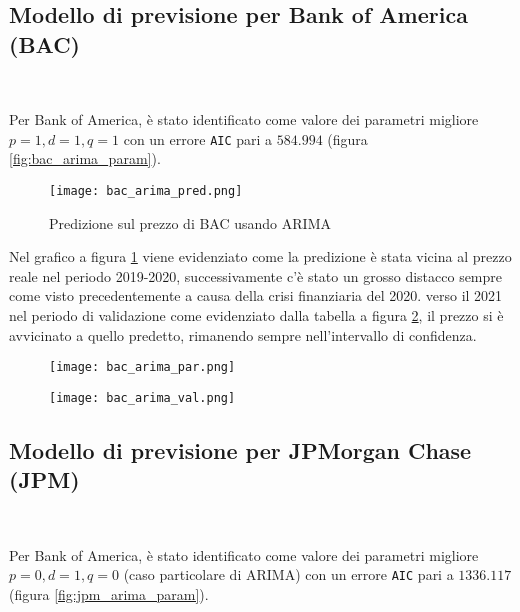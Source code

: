 \pagebreak

\subsection{Modello di previsione per Bank of America (BAC)}\

Per Bank of America, è stato identificato come valore dei parametri migliore \(p=1, d=1, q=1\) con un errore \verb|AIC| pari a \(584.994\) (figura \ref{fig:bac_arima_param}).

\begin{figure}[ht]
    \centering
    \texttt{[image: bac\_arima\_pred.png]}
    \caption{Predizione sul prezzo di BAC usando ARIMA}
    \label{fig:bac_arima_pred}
\end{figure}

Nel grafico a figura \ref{fig:bac_arima_pred} viene evidenziato come la predizione è stata vicina al prezzo reale nel periodo 2019-2020, successivamente c'è stato un grosso distacco sempre
come visto precedentemente a causa della crisi finanziaria del 2020. verso il 2021 nel periodo di validazione come evidenziato dalla tabella a figura \ref{fig:bac_arima_val}, il prezzo si è avvicinato a quello predetto, rimanendo sempre
nell'intervallo di confidenza.

\begin{figure}[ht]
    \centering
    \begin{minipage}{.5\textwidth}
        \centering
        \vspace{2.21cm}
        \texttt{[image: bac\_arima\_par.png]}
        \label{fig:bac_arima_param}
    \end{minipage}%
    \begin{minipage}{.5\textwidth}
        \centering
        \texttt{[image: bac\_arima\_val.png]}
        \label{fig:bac_arima_val}
    \end{minipage}
\end{figure}

\pagebreak

\subsection{Modello di previsione per JPMorgan Chase (JPM)}\

Per Bank of America, è stato identificato come valore dei parametri migliore \(p=0, d=1, q=0\) (caso particolare di ARIMA) con un errore \verb|AIC| pari a \(1336.117\) (figura \ref{fig:jpm_arima_param}).

